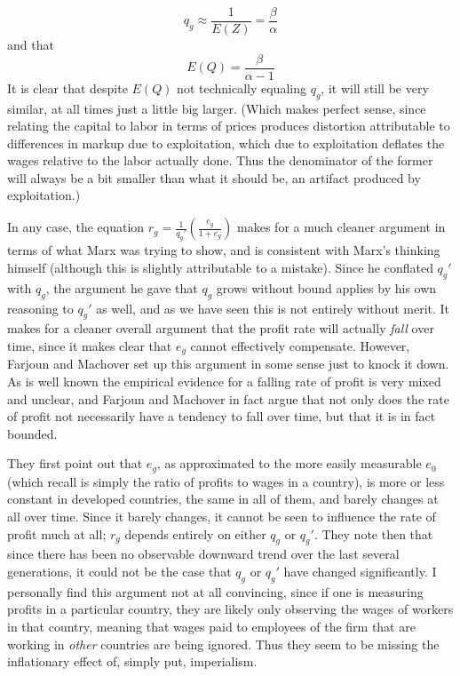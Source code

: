 \[ q_g \approx \frac{1}{E(Z)} = \frac{\beta}{\alpha} \]
and that
\[E(Q) = \frac{\beta}{\alpha-1} \]
It is clear that despite $E(Q)$ not technically equaling $q_g$, it will still be very similar, at all times just a little big larger. (Which makes perfect sense, since relating the capital to labor in terms of prices produces distortion attributable to differences in markup due to exploitation, which due to exploitation deflates the wages relative to the labor actually done. Thus the denominator of the former will always be a bit smaller than what it should be, an artifact produced by exploitation.)  
\par In any case, the equation $r_g = \frac{1}{q_g'}\left(\frac{e_g}{1+e_g}\right)$ makes for a much cleaner argument in terms of what Marx was trying to show, and is consistent with Marx's thinking himself (although this is slightly attributable to a mistake). Since he conflated $q_g'$ with $q_g$, the argument he gave that $q_g$ grows without bound applies by his own reasoning to $q_g'$ as well, and as we have seen this is not entirely without merit. It makes for a cleaner overall argument that the profit rate will actually \textit{fall} over time, since it makes clear that $e_g$ cannot effectively compensate. However, Farjoun and Machover set up this argument in some sense just to knock it down. As is well known the empirical evidence for a falling rate of profit is very mixed and unclear, and Farjoun and Machover in fact argue that not only does the rate of profit not necessarily have a tendency to fall over time, but that it is in fact bounded. \par 
They first point out that $e_g$, as approximated to the more easily measurable $e_0$ (which recall is simply the ratio of profits to wages in a country), is more or less constant in developed countries, the same in all of them, and barely changes at all over time. Since it barely changes, it cannot be seen to influence the rate of profit much at all; $r_g$ depends entirely on either $q_g$ or $q_g'$. They note then that since there has been no observable downward trend over the last several generations, it could not be the case that $q_g$ or $q_g'$ have changed significantly. I personally find this argument not at all convincing, since if one is measuring profits in a particular country, they are likely only observing the wages of workers in that country, meaning that wages paid to employees of the firm that are working in \textit{other} countries are being ignored. Thus they seem to be missing the inflationary effect of, simply put, imperialism. \par 
